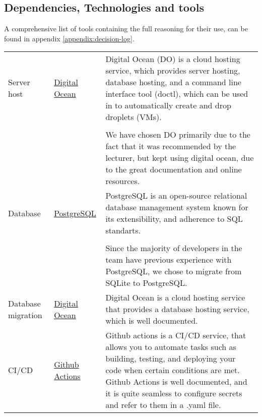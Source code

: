 \subsection{Dependencies, Technologies and tools}


A comprehensive list of tools containing the full reasoning for their use, can be found in appendix \ref{appendix:decision-log}.\\


\begin{longtable}{|p{}|p{} | p{}|}
    \hline
         Server host & \href{https://docs.digitalocean.com/}{Digital Ocean} & Digital Ocean (DO) is a cloud hosting service, which provides server hosting, database hosting, and a command line interface tool (doctl), which can be used in to automatically create and drop droplets (VMs).\\
         &&\\
         && We have chosen DO primarily due to the fact that it was recommended by the lecturer, but kept using digital ocean, due to the great documentation and online resources.\\
         \hline
         Database & \href{https://www.postgresql.org/docs/}{PostgreSQL} & PostgreSQL is an open-source relational database management system known for its extensibility, and adherence to SQL standarts.\\
         &&\\
         && Since the majority of developers in the team have previous experience with PostgreSQL, we chose to migrate from SQLite to PostgreSQL.\\
         \hline
         Database migration & \href{https://www.digitalocean.com/products/managed-databases}{Digital Ocean} & Digital Ocean is a cloud hosting service that provides a database hosting service, which is well documented.\\ %
         \hline
         CI/CD & \href{https://docs.github.com/en/actions}{Github Actions} & Github actions is a CI/CD service, that allows you to automate tasks such as building, testing, and deploying your code when certain conditions are met. Github Actions is well documented, and it is quite seamless to configure secrets and refer to them in a .yaml file.\\

\end{longtable}
